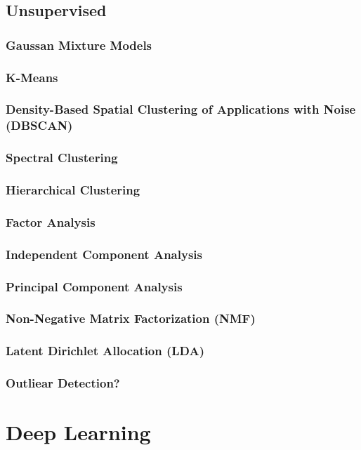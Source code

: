 \documentclass[11pt]{article}
\begin{document}
\subsection{Unsupervised}
\subsubsection{Gaussan Mixture Models}
\subsubsection{K-Means}
\subsubsection{Density-Based Spatial Clustering of Applications with Noise (DBSCAN)}
\subsubsection{Spectral Clustering}
\subsubsection{Hierarchical Clustering}
\subsubsection{Factor Analysis}
\subsubsection{Independent Component Analysis}
\subsubsection{Principal Component Analysis}
\subsubsection{Non-Negative Matrix Factorization (NMF)}
\subsubsection{Latent Dirichlet Allocation (LDA)}
\subsubsection{Outliear Detection?}

\section{Deep Learning}
\end{document}
